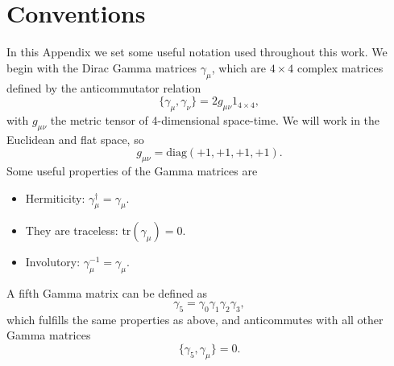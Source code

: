 
\chapter{Conventions}
\label{appex_conventions}

In this Appendix we set some useful notation used throughout this work. We begin with the Dirac Gamma matrices $\gamma_{\mu}$, which are $4\times 4$ complex matrices defined by the anticommutator relation
\begin{equation}
\{\gamma_{\mu},\gamma_{\nu}\}=2g_{\mu\nu}1_{4\times 4},
\end{equation}
with $g_{\mu\nu}$ the metric tensor of 4-dimensional space-time. We will work in the Euclidean and flat space, so
\begin{equation}
g_{\mu\nu}=\textrm{diag}(+1,+1,+1,+1).
\end{equation}
Some useful properties of the Gamma matrices are
\begin{itemize}
\item Hermiticity: $\gamma_{\mu}^{\dagger}=\gamma_{\mu}$.
\item They are traceless: $\textrm{tr}(\gamma_{\mu})=0$.
\item Involutory: $\gamma_{\mu}^{-1}=\gamma_{\mu}$.
\end{itemize}
A fifth Gamma matrix can be defined as
\begin{equation}
\gamma_5=\gamma_0\gamma_1\gamma_2\gamma_3,
\end{equation}
which fulfills the same properties as above, and anticommutes with all other Gamma matrices
\begin{equation}
\{\gamma_5,\gamma_{\mu}\}=0.
\end{equation}

